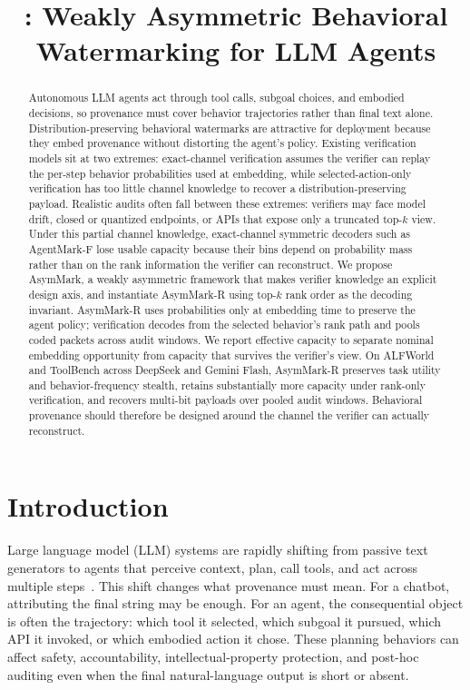 \documentclass[conference,compsoc]{IEEEtran}
\title{\framework: Weakly Asymmetric Behavioral Watermarking for LLM Agents}
\author{}
\newcommand{\framework}{AsymMark}
\newcommand{\ours}{AsymMark-R}
\newcommand{\agentmark}{AgentMark-F}
\begin{document}
\maketitle

\begin{abstract}
Autonomous LLM agents act through tool calls, subgoal choices, and embodied decisions, so provenance must cover behavior trajectories rather than final text alone. Distribution-preserving behavioral watermarks are attractive for deployment because they embed provenance without distorting the agent's policy. Existing verification models sit at two extremes: exact-channel verification assumes the verifier can replay the per-step behavior probabilities used at embedding, while selected-action-only verification has too little channel knowledge to recover a distribution-preserving payload. Realistic audits often fall between these extremes: verifiers may face model drift, closed or quantized endpoints, or APIs that expose only a truncated top-$k$ view. Under this partial channel knowledge, exact-channel symmetric decoders such as \agentmark{} lose usable capacity because their bins depend on probability mass rather than on the rank information the verifier can reconstruct. We propose \framework{}, a weakly asymmetric framework that makes verifier knowledge an explicit design axis, and instantiate \ours{} using top-$k$ rank order as the decoding invariant. \ours{} uses probabilities only at embedding time to preserve the agent policy; verification decodes from the selected behavior's rank path and pools coded packets across audit windows. We report effective capacity to separate nominal embedding opportunity from capacity that survives the verifier's view. On ALFWorld and ToolBench across DeepSeek and Gemini Flash, \ours{} preserves task utility and behavior-frequency stealth, retains substantially more capacity under rank-only verification, and recovers multi-bit payloads over pooled audit windows. Behavioral provenance should therefore be designed around the channel the verifier can actually reconstruct.
\end{abstract}

\section{Introduction}
\label{sec:introduction}

Large language model (LLM) systems are rapidly shifting from passive text generators to agents that perceive context, plan, call tools, and act across multiple steps~\cite{yao2022react,achiam2023gpt4,team2023gemini}. This shift changes what provenance must mean. For a chatbot, attributing the final string may be enough. For an agent, the consequential object is often the trajectory: which tool it selected, which subgoal it pursued, which API it invoked, or which embodied action it chose. These planning behaviors can affect safety, accountability, intellectual-property protection, and post-hoc auditing even when the final natural-language output is short or absent.
\end{document}
